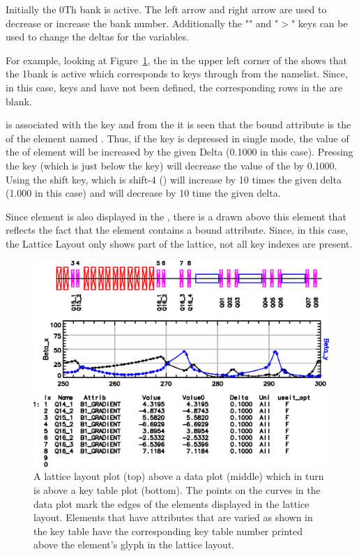 Initially the 0Th bank is active. The left arrow and right arrow are
used to decrease or increase the bank number.  Additionally the
"\vn{<}" and "$>$" keys can be used to change the deltas for the
variables.

For example, looking at Figure~\ref{f:key-table}, the  in
the upper left corner of the  shows that the 1\St bank
is active which corresponds to keys  through 
from the  namelist.  Since, in this case, keys
 and  have not been defined, the corresponding
rows in the  are blank.

 is associated with the  key and from the  it is seen that the bound attribute is the  of
the element named .  Thus, if the  key is depressed
in single mode, the value of the  of element
 will be increased by the given Delta (0.1000 in this
case). Pressing the  key (which is just below the 
key) will decrease the value of the  by 0.1000. Using
the shift key, which is shift-4 () will increase
 by 10 times the given delta (1.000 in this case) and
 will decrease by 10 time the given delta.

Since element  is also displayed in the ,
there is a  drawn above this element that reflects the fact
that the element contains a bound attribute. Since, in this case, the
Lattice Layout only shows part of the lattice, not all key indexes are
present.


\begin{figure}
  \centering
  \includegraphics[width=5in]{layout-graph-table.eps}
  \caption[Example key table with a lattice layout and data plots.]
{A lattice layout plot (top) above a data plot (middle) 
which in turn is above a key table plot (bottom). The points on the
curves in the data plot mark the edges of the elements displayed in
the lattice layout. Elements that have attributes that are varied as
shown in the key table have the corresponding key table number printed
above the element's glyph in the lattice layout.}
  \label{f:key-table}
\end{figure}

